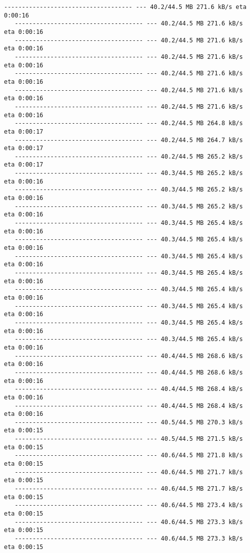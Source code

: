 \documentclass[11pt]{article}
\begin{document}
\begin{Verbatim}[commandchars=\\\{\}]
   ------------------------------------ --- 40.2/44.5 MB 271.6 kB/s eta 0:00:16
   ------------------------------------ --- 40.2/44.5 MB 271.6 kB/s eta 0:00:16
   ------------------------------------ --- 40.2/44.5 MB 271.6 kB/s eta 0:00:16
   ------------------------------------ --- 40.2/44.5 MB 271.6 kB/s eta 0:00:16
   ------------------------------------ --- 40.2/44.5 MB 271.6 kB/s eta 0:00:16
   ------------------------------------ --- 40.2/44.5 MB 271.6 kB/s eta 0:00:16
   ------------------------------------ --- 40.2/44.5 MB 271.6 kB/s eta 0:00:16
   ------------------------------------ --- 40.2/44.5 MB 264.8 kB/s eta 0:00:17
   ------------------------------------ --- 40.2/44.5 MB 264.7 kB/s eta 0:00:17
   ------------------------------------ --- 40.2/44.5 MB 265.2 kB/s eta 0:00:17
   ------------------------------------ --- 40.3/44.5 MB 265.2 kB/s eta 0:00:16
   ------------------------------------ --- 40.3/44.5 MB 265.2 kB/s eta 0:00:16
   ------------------------------------ --- 40.3/44.5 MB 265.2 kB/s eta 0:00:16
   ------------------------------------ --- 40.3/44.5 MB 265.4 kB/s eta 0:00:16
   ------------------------------------ --- 40.3/44.5 MB 265.4 kB/s eta 0:00:16
   ------------------------------------ --- 40.3/44.5 MB 265.4 kB/s eta 0:00:16
   ------------------------------------ --- 40.3/44.5 MB 265.4 kB/s eta 0:00:16
   ------------------------------------ --- 40.3/44.5 MB 265.4 kB/s eta 0:00:16
   ------------------------------------ --- 40.3/44.5 MB 265.4 kB/s eta 0:00:16
   ------------------------------------ --- 40.3/44.5 MB 265.4 kB/s eta 0:00:16
   ------------------------------------ --- 40.3/44.5 MB 265.4 kB/s eta 0:00:16
   ------------------------------------ --- 40.4/44.5 MB 268.6 kB/s eta 0:00:16
   ------------------------------------ --- 40.4/44.5 MB 268.6 kB/s eta 0:00:16
   ------------------------------------ --- 40.4/44.5 MB 268.4 kB/s eta 0:00:16
   ------------------------------------ --- 40.4/44.5 MB 268.4 kB/s eta 0:00:16
   ------------------------------------ --- 40.5/44.5 MB 270.3 kB/s eta 0:00:15
   ------------------------------------ --- 40.5/44.5 MB 271.5 kB/s eta 0:00:15
   ------------------------------------ --- 40.6/44.5 MB 271.8 kB/s eta 0:00:15
   ------------------------------------ --- 40.6/44.5 MB 271.7 kB/s eta 0:00:15
   ------------------------------------ --- 40.6/44.5 MB 271.7 kB/s eta 0:00:15
   ------------------------------------ --- 40.6/44.5 MB 273.4 kB/s eta 0:00:15
   ------------------------------------ --- 40.6/44.5 MB 273.3 kB/s eta 0:00:15
   ------------------------------------ --- 40.6/44.5 MB 273.3 kB/s eta 0:00:15

\end{Verbatim}
\end{document}
